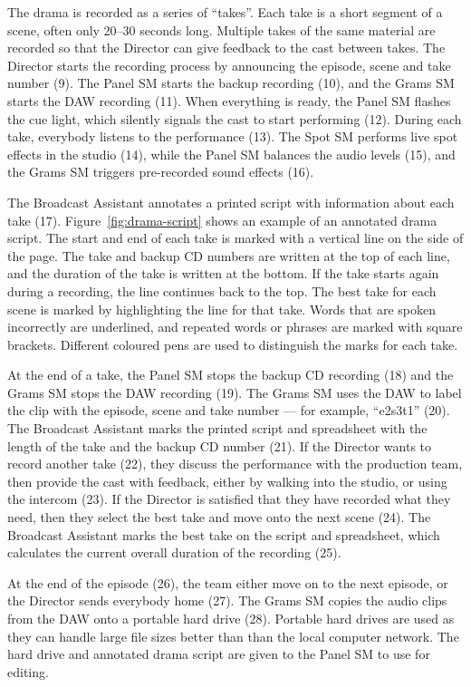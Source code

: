 The drama is recorded as a series of ``takes''. Each take is a short segment of a scene, often only 20--30 seconds
long.  Multiple takes of the same material are recorded so that the Director can give feedback to the cast between
takes.  The Director starts the recording process by announcing the episode, scene and take number (9).  The Panel SM
starts the backup recording (10), and the Grams SM starts the DAW recording (11). When everything is ready, the Panel
SM flashes the cue light, which silently signals the cast to start performing (12).  During each take, everybody
listens to the performance (13). The Spot SM performs live spot effects in the studio (14), while the Panel SM balances
the audio levels (15), and the Grams SM triggers pre-recorded sound effects (16).

The Broadcast Assistant annotates a printed script with information about each take (17).  Figure~\ref{fig:drama-script}
shows an example of an annotated drama script.  The start and end of each take is marked with a vertical line on the
side of the page. The take and backup CD numbers are written at the top of each line, and the duration of the take is
written at the bottom.  If the take starts again during a recording, the line continues back to the top.  The best take
for each scene is marked by highlighting the line for that take.  Words that are spoken incorrectly are underlined, and
repeated words or phrases are marked with square brackets.  Different coloured pens are used to distinguish the marks
for each take.  


At the end of a take, the Panel SM stops the backup CD recording (18) and the Grams SM stops the DAW recording (19).
The Grams SM uses the DAW to label the clip with the episode, scene and take number --- for example, ``e2s3t1'' (20).
The Broadcast Assistant marks the printed script and spreadsheet with the length of the take and the backup CD number
(21).  If the Director wants to record another take (22), they discuss the performance with the production team, then
provide the cast with feedback, either by walking into the studio, or using the intercom (23).  If the Director is
satisfied that they have recorded what they need, then they select the best take and move onto the next scene (24). The
Broadcast Assistant marks the best take on the script and spreadsheet, which calculates the current overall duration of
the recording (25).

At the end of the episode (26), the team either move on to the next episode, or the Director sends everybody home (27).
The Grams SM copies the audio clips from the DAW onto a portable hard drive (28).  Portable hard drives are used as
they can handle large file sizes better than than the local computer network.  The hard drive and annotated drama
script are given to the Panel SM to use for editing.


